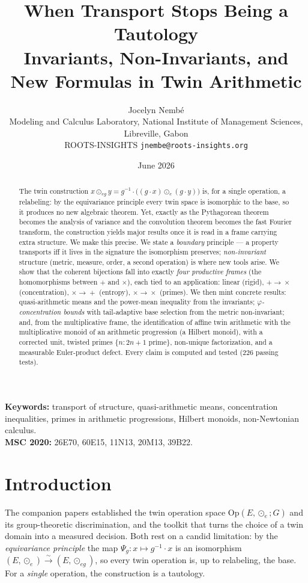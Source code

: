 \documentclass[11pt,a4paper]{article}
\title{\textbf{When Transport Stops Being a Tautology}\\[0.3em]
\large Invariants, Non-Invariants, and New Formulas in Twin Arithmetic}
\author{Jocelyn Nemb\'e\\
\small Modeling and Calculus Laboratory, National Institute of Management
Sciences, Libreville, Gabon\\
\small ROOTS-INSIGHTS \quad\textbar\quad \texttt{jnembe@roots-insights.org}}
\date{June 2026}
\newcommand{\Op}{\mathrm{Op}}
\theoremstyle{plain}
\theoremstyle{definition}
\theoremstyle{remark}
\begin{document}
\maketitle

\begin{abstract}
\noindent
The twin construction $x\odot_{eg}y=g^{-1}\!\cdot\!\bigl((g\cdot x)\odot_e
(g\cdot y)\bigr)$ is, for a single operation, a relabeling: by the equivariance
principle every twin space is isomorphic to the base, so it produces no new
algebraic theorem. Yet, exactly as the Pythagorean theorem becomes the analysis
of variance and the convolution theorem becomes the fast Fourier transform, the
construction yields major results once it is read in a frame carrying extra
structure. We make this precise. We state a \emph{boundary} principle ---
a property transports iff it lives in the signature the isomorphism preserves;
\emph{non-invariant} structure (metric, measure, order, a second operation) is
where new tools arise. We show that the coherent bijections fall into exactly
\emph{four productive frames} (the homomorphisms between $+$ and $\times$), each
tied to an application: linear (rigid), $+\!\to\!\times$ (concentration),
$\times\!\to\!+$ (entropy), $\times\!\to\!\times$ (primes). We then mint
concrete results: quasi-arithmetic means and the power-mean inequality from the
invariants; \emph{$\varphi$-concentration bounds} with tail-adaptive base
selection from the metric non-invariant; and, from the multiplicative frame, the
identification of affine twin arithmetic with the multiplicative monoid of an
arithmetic progression (a Hilbert monoid), with a corrected unit, twisted primes
$\{n:2n+1\text{ prime}\}$, non-unique factorization, and a measurable
Euler-product defect. Every claim is computed and tested ($226$ passing tests).
\end{abstract}

\noindent\textbf{Keywords:} transport of structure, quasi-arithmetic means,
concentration inequalities, primes in arithmetic progressions, Hilbert monoids,
non-Newtonian calculus.\\
\textbf{MSC 2020:} 26E70, 60E15, 11N13, 20M13, 39B22.

\section{Introduction}

The companion papers established the twin operation space $\Op(E,\odot_e;G)$ and
its group-theoretic discrimination, and the toolkit that turns the choice of a
twin domain into a measured decision. Both rest on a candid limitation: by the
\emph{equivariance principle} the map $\Psi_g:x\mapsto g^{-1}\cdot x$ is an
isomorphism $(E,\odot_e)\xrightarrow{\sim}(E,\odot_{eg})$, so every twin
operation is, up to relabeling, the base. For a \emph{single} operation, the
construction is a tautology.
\end{document}
